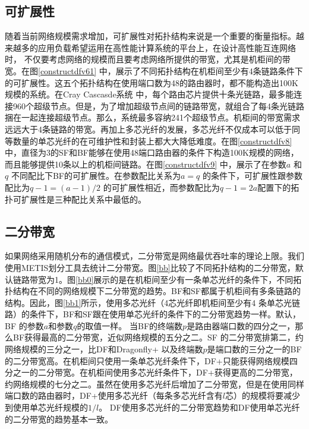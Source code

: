 \subsection{可扩展性}

随着当前网络规模需求增加，可扩展性对拓扑结构来说是一个重要的衡量指标。越来越多的应用负载希望运用在高性能计算系统的平台上，在设计高性能互连网络时，
不仅要考虑网络的规模而且要考虑网络所提供的带宽，尤其是机柜间的带宽。在图\ref{constructdfv61} 中，展示了不同拓扑结构在机柜间至少有4条链路条件下的可扩展性。这五个拓扑结构在使用端口数为48的路由器时，都不能构造出100K规模的系统。在Cray Cascasde系统 中，每个路由芯片提供十条光链路，最多能连接960个超级节点。但是，为了增加超级节点间的链路带宽，就组合了每4条光链路捆在一起连接超级节点。那么，系统最多容纳241个超级节点。机柜间的带宽需求远远大于4条链路的带宽。再加上多芯光纤的发展，多芯光纤不仅成本可以低于同等数量的单芯光纤的在可维护性和封装上都大大降低难度。在图\ref{constructdfv8} 中，直径为3的SF和BF能够在使用48端口路由器的条件下构造100K规模的网络，而且能够提供10条以上的机柜间链路。在图\ref{constructdfv9} 中，展示了在参数$a$ 和$q$ 不同配比下BF的可扩展性。在参数配比关系为$a=q$ 的条件下，可扩展性跟参数配比为$q-1=(a-1)/2$ 的可扩展性相近，而参数配比为$q-1=2a$配置下的拓扑可扩展性是三种配比关系中最低的。

\subsection{二分带宽}

如果网络采用随机分布的通信模式，二分带宽是网络最优吞吐率的理论上限。我们使用METIS划分工具去统计二分带宽。图\ref{bb}比较了不同拓扑结构的二分带宽，默认链路带宽为1。图\ref{bb0}展示的是在机柜间至少有一条单芯光纤的条件下，不同拓扑结构在不同的网络规模下二分带宽的趋势。BF和SF都属于机柜间有多条链路的结构。因此，图\ref{bb1}所示，使用多芯光纤（4芯光纤即机柜间至少有4 条单芯光链路）的条件下，BF和SF跟在使用单芯光纤的条件下的二分带宽趋势一样。默认，BF 的参数$a$和参数$q$的取值一样。 当BF的终端数$p$是路由器端口数的四分之一，那么BF获得最高的二分带宽，近似网络规模的五分之二。SF 的二分带宽排第二，约网络规模的三分之一，比DF和Dragonfly+ 以及终端数$p$是端口数的三分之一的BF的二分带宽高。在机柜间只使用一条单芯光纤条件下，DF+只能获得网络规模四分之一的二分带宽。在机柜间使用多芯光纤条件下，DF+获得更高的二分带宽，约网络规模的七分之二。虽然在使用多芯光纤后增加了二分带宽，但是在使用同样端口数的路由器时，DF+使用多芯光纤（每条多芯光纤含有$l$芯）的规模将要减少到使用单芯光纤规模的$1/l$。 DF使用多芯光纤的二分带宽趋势和DF使用单芯光纤的二分带宽的趋势基本一致。

